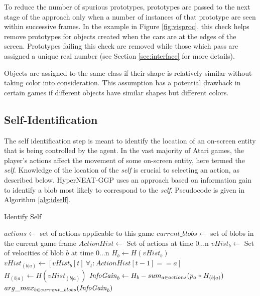 \documentclass{sig-alternate}
\begin{document}
To reduce the number of spurious prototypes, prototypes are passed to the next stage of the approach only when a number of instances of that prototype are seen within successive frames. In the example in Figure \ref{fig:visproc}, this check helps remove prototypes for objects created when the cars are at the edges of the screen. Prototypes failing this check are removed while those which pass are assigned a unique real number (see Section \ref{sec:interface} for more details).

Objects are assigned to the same class if their shape is relatively similar without taking color into consideration. This assumption has a potential drawback in certain games if different objects have similar shapes but different colors. 

\subsection{Self-Identification}
The self identification step is meant to identify the location of an on-screen entity that is being controlled by the agent. In the vast majority of Atari games, the player's actions affect the movement of some on-screen entity, here termed the \textit{self}. Knowledge of the location of the \textit{self} is crucial to selecting an action, as described below. HyperNEAT-GGP uses an approach based on information gain to identify a blob most likely to correspond to the \textit{self}. Pseudocode is given in Algorithm \ref{alg:idself}.

\begin{algorithm}
\caption{Identify Self}
\label{alg:idself}
\begin{algorithmic}[1]
  \STATE $actions \leftarrow $ set of actions applicable to this game
  \STATE $current\_blobs \leftarrow $ set of blobs in the current game frame
  \STATE $ActionHist \leftarrow$ Set of actions at time 0...n
  \STATE $vHist_b \leftarrow$ Set of velocities of blob $b$ at time 0...n
  \STATE $H_b \leftarrow H(vHist_b)$ 
  \STATE $vHist_{(b|a)} \leftarrow [vHist_b[t] ~\forall_t: ActionHist[t-1] == a]$ 
  \STATE $H_{(b|a)} \leftarrow H(vHist_{(b|a)})$ %
  \ENDFOR
  \STATE $\textrm{\emph{InfoGain}}_b \leftarrow H_b - sum_{a \in actions}(p_a * H_{(b|a)})$ %
  \ENDFOR
  \RETURN $arg\_max_{b \in current\_blobs}(\textrm{\emph{InfoGain}}_b)$ %
\end{algorithmic}
\end{algorithm}
\end{document}
